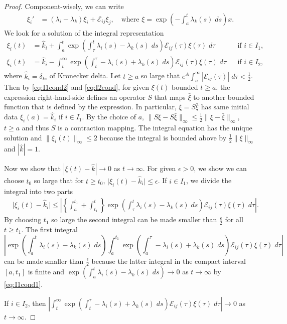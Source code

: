 \documentclass[a4paper,11pt]{article}
\theoremstyle{remark}
\begin{document}
\begin{proof}
Component-wisely, we can write
\begin{align*}
 \xi_i' & = (\lambda_i-\lambda_k)\xi_i + \mathcal{E}_{ij}\xi_j, \quad \text{where $\xi = \exp\left(-\int_a^t \lambda_k(s) \; ds\right)x$.}
\end{align*}
We look for a solution of the integral representation
\begin{align*}
 \xi_i(t) &= \hat{k}_i + \int_a^t \exp\left(\int_\tau^t \lambda_i(s)-\lambda_k(s) \; ds\right)\mathcal{E}_{ij}(\tau)\xi(\tau) \; d\tau && \text{if $i\in I_1$,}\\
 \xi_i(t) &= \hat{k}_i -\int_t^\infty \exp\left(\int_t^\tau -\lambda_i(s)+\lambda_k(s) \; ds\right)\mathcal{E}_{ij}(\tau)\xi(\tau) \; d\tau && \text{if $i\in I_2$,}
\end{align*}
where $\hat{k}_i = \delta_{k i}$ of Kronecker delta. Let $t\ge a$ so large that $e^A\int_a^\infty |\mathcal{E}_{ij}(\tau)|\; d\tau < \frac{1}{2}$. Then by \eqref{eq:I1cond2} and \eqref{eq:I2cond}, for given $\bar\xi(t)$ bounded $t\ge a$, the expression right-hand-side defines an operator $S$ that maps $\bar\xi$ to another bounded function that is defined by the expression. In particular, $\xi=S\bar\xi$ has same initial data $\xi_i(a) = \hat{k}_i$ if $i\in I_1$.
By the choice of $a$, $\|S\xi - S\bar\xi\|_\infty \le \frac{1}{2}\|\xi-\bar\xi\|_\infty$, $t\ge a$ and thus $S$ is a contraction mapping. The integral equation has the unique solution and $\|\xi_i(t)\|_\infty \le 2$ because the integral is bounded above by $ \frac{1}{2} \|\xi\|_\infty$ and $|\hat{k}|=1$.

Now we show that $|\xi(t)-\hat{k}| \rightarrow 0$ as $t \rightarrow \infty$. For given $\epsilon>0$, we show we can choose $t_0$ so large that for $t\ge t_0$, $\big|\xi_i(t)-\hat{k}_i\big| \le \epsilon$. If $i\in I_1$, we divide the integral into two parts
\begin{align*}
 &\big|\xi_i(t)-\hat{k}_i\big| \le \left|\left\{ \int_a^{t_1} + \int_{t_1}^t \right\} \exp\left(\int_\tau^t \lambda_i(s)-\lambda_k(s) \; ds\right)\mathcal{E}_{ij}(\tau)\xi(\tau) \; d\tau \right|.
\end{align*}
By choosing $t_1$ so large the second integral can be made smaller than $ \frac{\epsilon}{2}$ for all $t\ge t_1$. The first integral $$\left|\exp\left(\int_a^t \lambda_i(s)-\lambda_k(s) \; ds\right)\int_a^{t_1} \exp\left(\int_a^\tau -\lambda_i(s)+\lambda_k(s) \; ds\right)\mathcal{E}_{ij}(\tau)\xi(\tau) \; d\tau \right|$$
can be made smaller than $ \frac{\epsilon}{2}$ because the latter integral in the compact interval $[a, t_1]$ is finite and $\exp\left(\int_a^t \lambda_i(s)-\lambda_k(s) \; ds\right) \rightarrow 0$ as $t \rightarrow \infty$ by \eqref{eq:I1cond1}.

If $i\in I_2$, then $\left|\int_t^\infty \exp\left(\int_t^\tau -\lambda_i(s)+\lambda_k(s) \; ds\right)\mathcal{E}_{ij}(\tau)\xi(\tau) \; d\tau\right| \rightarrow 0$ as $t \rightarrow \infty$.
\end{proof}
\end{document}
